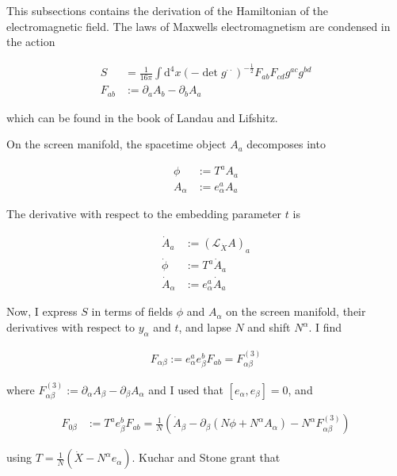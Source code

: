 \documentclass[11pt]{article}
\begin{document}
This subsections contains the derivation of the Hamiltonian of the electromagnetic field. The laws of Maxwells electromagnetism are condensed in the action

\begin{align}
	S &= \frac{1}{16 \pi} \int \mathrm{d}^4 x \left( - \det{g^{\cdot \cdot}} \right)^{-\frac{1}{2}} F_{ab} F_{cd} g^{ac} g^{bd}\\
	F_{ab} &:= \partial_a A_b - \partial_b A_a 
\end{align}

which can be found in the book of Landau and Lifshitz.

On the screen manifold, the spacetime object $A_a$ decomposes into

\begin{align}
	\phi &:= T^a A_a\\
	A_{\alpha} &:= e^a_{\alpha} A_a
\end{align}

The derivative with respect to the embedding parameter $t$ is 

\begin{align}
	\dot{A}_{a} &:= \left( \mathcal{L}_{\dot{X}} A \right)_a\\
	\dot{\phi} &:= T^a \dot{A}_{a}\\
	\dot{A}_{\alpha} &:= e^a_{\alpha} \dot{A}_{a}
\end{align}


Now, I express $S$ in terms of fields $\phi$ and $A_{\alpha}$ on the screen manifold, their derivatives with respect to $y_\alpha$ and $t$, and lapse $N$ and shift $N^{\alpha}$. I find

\begin{align}
	F_{\alpha \beta} := e^a_{\alpha} e^b_{\beta} F_{a b} = F^{(3)}_{\alpha \beta}
\end{align}

where $F^{(3)}_{\alpha \beta} := \partial_{\alpha} A_{\beta} - \partial_{\beta} A_{\alpha}  $ and I used that $\left[ e_{\alpha}, e_{\beta}\right] = 0 $, and

\begin{align}
	F_{0 \beta} &:= T^a e^b_{\beta} F_{a b} = \frac{1}{N} \left( \dot{A}_{\beta} - \partial_{\beta} \left( N \phi +  N^{\alpha} A_{\alpha} \right) - N^{\alpha}  F^{(3)}_{\alpha \beta} \right)
\end{align}

using $ T = \frac{1}{N} \left( \dot{X} - N^\alpha e_{\alpha} \right)$. Kuchar  and Stone grant that 
\end{document}
